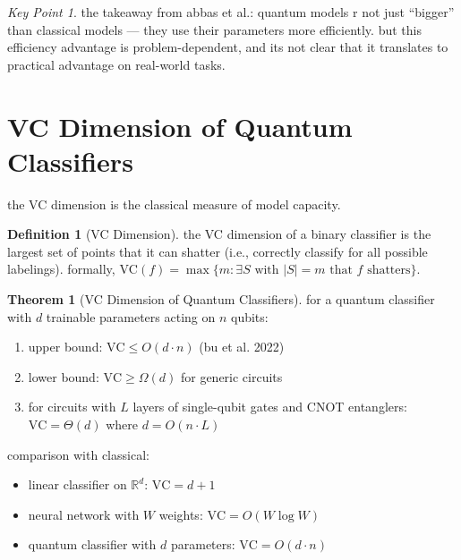 \documentclass[11pt,a4paper]{article}
\theoremstyle{definition}
\newtheorem{definition}{Definition}[section]
\newtheorem{theorem}{Theorem}[section]
\theoremstyle{remark}
\newtheorem*{keypoint}{Key Point}
\begin{document}
\begin{keypoint}
the takeaway from abbas et al.: quantum models r not just ``bigger'' than classical models --- they use their parameters more efficiently. but this efficiency advantage is problem-dependent, and its not clear that it translates to practical advantage on real-world tasks.
\end{keypoint}

\section{VC Dimension of Quantum Classifiers}

the VC dimension is the classical measure of model capacity.

\begin{definition}[VC Dimension]
the VC dimension of a binary classifier is the largest set of points that it can shatter (i.e., correctly classify for all possible labelings). formally, $\text{VC}(f) = \max\{m : \exists S \text{ with } |S| = m \text{ that } f \text{ shatters}\}$.
\end{definition}

\begin{theorem}[VC Dimension of Quantum Classifiers]
for a quantum classifier with $d$ trainable parameters acting on $n$ qubits:
\begin{enumerate}[nosep]
    \item upper bound: $\text{VC} \leq O(d \cdot n)$ (bu et al. 2022)
    \item lower bound: $\text{VC} \geq \Omega(d)$ for generic circuits
    \item for circuits with $L$ layers of single-qubit gates and CNOT entanglers: $\text{VC} = \Theta(d)$ where $d = O(n \cdot L)$
\end{enumerate}
\end{theorem}

comparison with classical:
\begin{itemize}[nosep]
    \item linear classifier on $\mathbb{R}^d$: $\text{VC} = d + 1$
    \item neural network with $W$ weights: $\text{VC} = O(W \log W)$
    \item quantum classifier with $d$ parameters: $\text{VC} = O(d \cdot n)$
\end{itemize}
\end{document}
